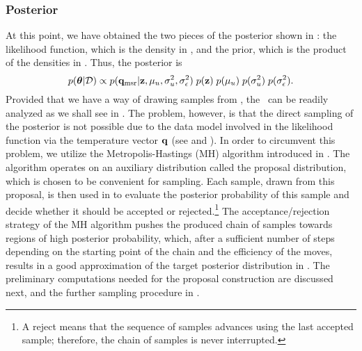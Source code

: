 \subsubsection{Posterior}
At this point, we have obtained the two pieces of the posterior shown in : the likelihood function, which is the density in , and the prior, which is the product of the densities in . Thus, the posterior is
\begin{equation} \elabel{posterior}
  \f{\vparam | \Data} \propto \f{\mvT_\meas | \vz, \mu_\u, \sigma^2_\u, \sigma^2_\noise} \; \f{\vz} \; \f{\mu_\u} \; \f{\sigma^2_\u} \; \f{\sigma^2_\noise}.
\end{equation}
Provided that we have a way of drawing samples from , the \qoi\ can be readily analyzed as we shall see in .
The problem, however, is that the direct sampling of the posterior is not possible due to the data model involved in the likelihood function via the temperature vector $\mathbf{q}$ (see  and ).
In order to circumvent this problem, we utilize the Metropolis-Hastings (MH) algorithm \cite{gelman2004} introduced in .
The algorithm operates on an auxiliary distribution called the proposal distribution, which is chosen to be convenient for sampling.
Each sample, drawn from this proposal, is then used in  to evaluate the posterior probability of this sample and decide whether it should be accepted or rejected.\footnote{A reject means that the sequence of samples advances using the last accepted sample; therefore, the chain of samples is never interrupted.}
The acceptance/rejection strategy of the MH algorithm pushes the produced chain of samples towards regions of high posterior probability, which, after a sufficient number of steps depending on the starting point of the chain and the efficiency of the moves, results in a good approximation of the target posterior distribution in .
The preliminary computations needed for the proposal construction are discussed next, and the further sampling procedure in .
